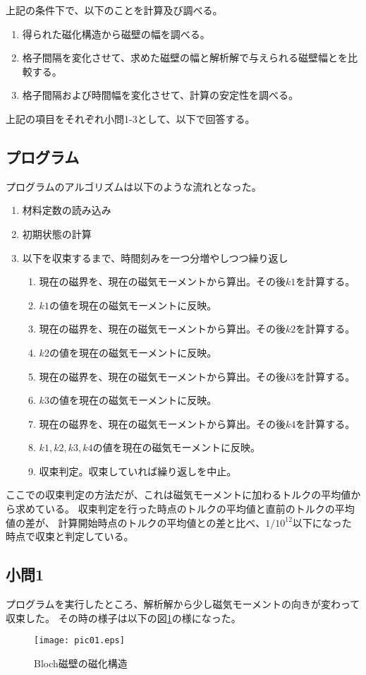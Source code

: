 \documentclass{jsarticle}
\begin{document}
上記の条件下で、以下のことを計算及び調べる。
\begin{enumerate}
 \item 得られた磁化構造から磁壁の幅を調べる。
 \item 格子間隔を変化させて、求めた磁壁の幅と解析解で与えられる磁壁幅とを比較する。
 \item 格子間隔および時間幅を変化させて、計算の安定性を調べる。
\end{enumerate}
上記の項目をそれぞれ小問1-3として、以下で回答する。

\subsection{プログラム}
プログラムのアルゴリズムは以下のような流れとなった。
\begin{enumerate}
 \item 材料定数の読み込み
 \item 初期状態の計算
 \item 以下を収束するまで、時間刻みを一つ分増やしつつ繰り返し
 \begin{enumerate}
  \item 現在の磁界を、現在の磁気モーメントから算出。その後$k1$を計算する。
  \item $k1$の値を現在の磁気モーメントに反映。
  \item 現在の磁界を、現在の磁気モーメントから算出。その後$k2$を計算する。
  \item $k2$の値を現在の磁気モーメントに反映。
  \item 現在の磁界を、現在の磁気モーメントから算出。その後$k3$を計算する。
  \item $k3$の値を現在の磁気モーメントに反映。
  \item 現在の磁界を、現在の磁気モーメントから算出。その後$k4$を計算する。
  \item $k1,k2,k3,k4$の値を現在の磁気モーメントに反映。
  \item 収束判定。収束していれば繰り返しを中止。
 \end{enumerate}
\end{enumerate}

ここでの収束判定の方法だが、これは磁気モーメントに加わるトルクの平均値から求めている。
収束判定を行った時点のトルクの平均値と直前のトルクの平均値の差が、
計算開始時点のトルクの平均値との差と比べ、$1/10^{12}$以下になった時点で収束と判定している。

\subsection{小問1}
プログラムを実行したところ、解析解から少し磁気モーメントの向きが変わって収束した。
その時の様子は以下の図\ref{fig01}の様になった。
\begin{figure}[H]
	\centering
	\texttt{[image: pic01.eps]}
	\caption{Bloch磁壁の磁化構造}
	\label{fig01}
\end{figure}
\end{document}
